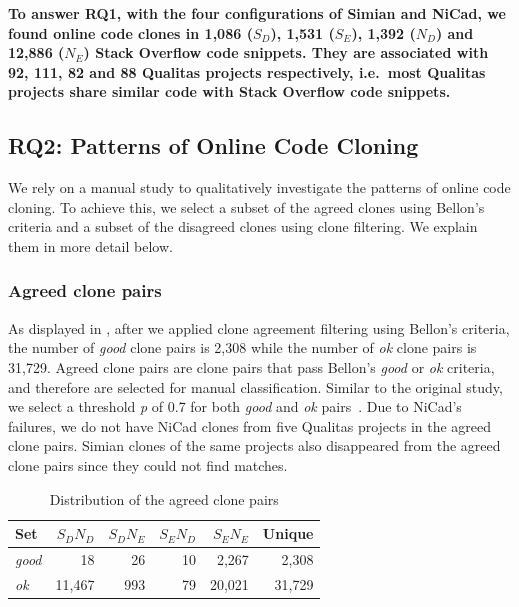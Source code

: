 \documentclass[sigconf,review, anonymous]{acmart}
\begin{document}
\textbf{To answer RQ1, with the four configurations of Simian and
  NiCad, we found online code clones in 1,086 ($S_D$), 1,531 ($S_E$),
  1,392 ($N_D$) and 12,886 ($N_E$) Stack Overflow code snippets. They
  are associated with 92, 111, 82 and 88 Qualitas projects
  respectively, i.e.~most Qualitas projects share similar code with
  Stack Overflow code snippets.}


\subsection{RQ2: Patterns of Online Code Cloning}

We rely on a manual study to qualitatively investigate the patterns of online code cloning. To achieve this, we select a subset of the agreed clones using Bellon's criteria and a subset of the disagreed clones using clone filtering. We explain them in more detail below.

\subsubsection{Agreed clone pairs}

As displayed in , after we applied clone agreement filtering using Bellon's criteria, the number of \textit{good} clone pairs is 2,308 while the number of \textit{ok} clone pairs is 31,729. %
Agreed clone pairs are clone pairs that pass Bellon's \textit{good} or \textit{ok} criteria, and therefore are selected for manual classification. Similar to the original study, we select a threshold \textit{p} of 0.7 for both \textit{good} and \textit{ok} pairs~\cite{Bellon2007}. %
Due to NiCad's failures, we do not have NiCad clones from five Qualitas projects in the agreed clone pairs. Simian clones of the same projects also disappeared from the agreed clone pairs since they could not find matches.

\begin{table}
	\centering
	\caption{Distribution of the agreed clone pairs}
	\label{t_agreed_good_clone_pairs}
	\small
	\begin{tabular}{l|r|r|r|r|r}
		\hline
		Set & $S_DN_D$ & $S_DN_E$ & $S_EN_D$ & $S_EN_E$ & Unique \\
		\hline
		\textit{good} & 18 & 26 & 10 & 2,267 & 2,308 \\
		\textit{ok} & 11,467 & 993 & 79 & 20,021 & 31,729  \\
		\hline
	\end{tabular} %
\end{table}
\end{document}
